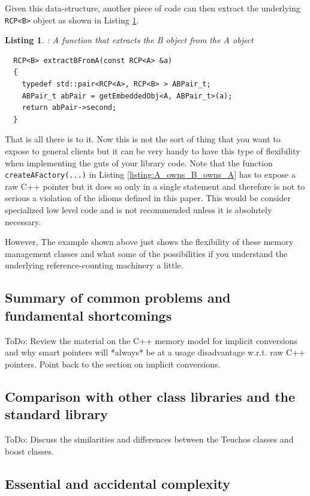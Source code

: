 \documentclass[pdf,ps2pdf,11pt]{SANDreport}
\newtheorem{listing}{Listing}
\begin{document}
Given this data-structure, another piece of code can then extract the
underlying {}\texttt{RCP<B>} object as shown in Listing
{}\ref{listing:Extract_B_from_A}.

\begin{listing}: A function that extracts the B object from the A object \\
\label{listing:Extract_B_from_A}
{\small\begin{verbatim}
  RCP<B> extractBFromA(const RCP<A> &a)
  {
    typedef std::pair<RCP<A>, RCP<B> > ABPair_t;
    ABPair_t abPair = getEmbeddedObj<A, ABPair_t>(a);
    return abPair->second;
  }
\end{verbatim}}
\end{listing}

That is all there is to it.  Now this is not the sort of thing that
you want to expose to general clients but it can be very handy to have
this type of flexibility when implementing the guts of your library
code.  Note that the function {}\texttt{createAFactory(...)} in
Listing {}\ref{listing:A_owns_B_owns_A} has to expose a raw C++
pointer but it does so only in a single statement and therefore is not
to serious a violation of the idioms defined in this paper.  This
would be consider specialized low level code and is not recommended
unless it is absolutely necessary.

However, The example shown above just shows the flexibility of these
memory management classes and what some of the possibilities if you
understand the underlying reference-counting machinery a little.


%
{}\subsection{Summary of common problems and fundamental shortcomings}
%

ToDo: Review the material on the C++ memory model for implicit
conversions and why smart pointers will *always* be at a usage
disadvantage w.r.t. raw C++ pointers.  Point back to the section on
implicit conversions.


%
{}\subsection{Comparison with other class libraries and the standard
library}
%

ToDo: Discuss the similarities and differences between the Teuchos
classes and boost classes.


%
{}\subsection{Essential and accidental complexity}
%
\end{document}
